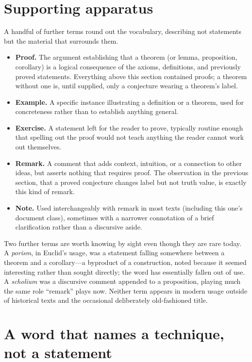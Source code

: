 \documentclass{essay}
\begin{document}
\section{Supporting apparatus}

A handful of further terms round out the vocabulary, describing not statements but the material that surrounds them.

\begin{itemize}
\item \textbf{Proof.} The argument establishing that a theorem (or lemma, proposition, corollary) is a logical consequence of the axioms, definitions, and previously proved statements. Everything above this section contained proofs; a theorem without one is, until supplied, only a conjecture wearing a theorem's label.
\item \textbf{Example.} A specific instance illustrating a definition or a theorem, used for concreteness rather than to establish anything general.
\item \textbf{Exercise.} A statement left for the reader to prove, typically routine enough that spelling out the proof would not teach anything the reader cannot work out themselves.
\item \textbf{Remark.} A comment that adds context, intuition, or a connection to other ideas, but asserts nothing that requires proof. The observation in the previous section, that a proved conjecture changes label but not truth value, is exactly this kind of remark.
\item \textbf{Note.} Used interchangeably with remark in most texts (including this one's document class), sometimes with a narrower connotation of a brief clarification rather than a discursive aside.
\end{itemize}

\begin{remark}
Two further terms are worth knowing by sight even though they are rare today. A \emph{porism}, in Euclid's usage, was a statement falling somewhere between a theorem and a corollary---a byproduct of a construction, noted because it seemed interesting rather than sought directly; the word has essentially fallen out of use. A \emph{scholium} was a discursive comment appended to a proposition, playing much the same role ``remark'' plays now. Neither term appears in modern usage outside of historical texts and the occasional deliberately old-fashioned title.
\end{remark}

\section{A word that names a technique, not a statement}
\end{document}
